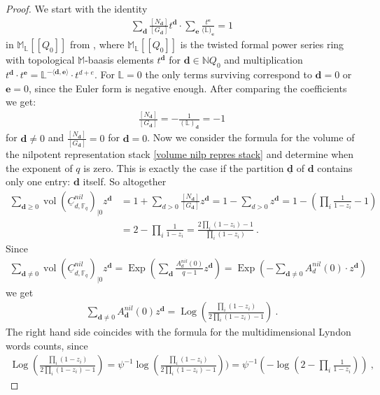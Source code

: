 \documentclass{article}
\newcommand{\bd}{\mathbf{d}}
\newcommand{\be}{\mathbf{e}}
\DeclareMathOperator{\Exp}{Exp}
\DeclareMathOperator{\vol}{vol}
\DeclareMathOperator{\Log}{Log}
\begin{document}
 \begin{proof}
   We start with the identity 
   \begin{align*}
       \sum_{\bd} \frac{[N_{\bd}]}{[G_{\bd}]} t^{\bd} \cdot \sum_{\be} \frac{t^{\be}}{(\mathbb{L)_{\be}}}=1
   \end{align*}
   in $\mathbb{M}_{\mathbb{L}}[[Q_0]]$ from \cite{motivenullcone}, where $\mathbb{M}_{\mathbb{L}} [[Q_0]]$ is the twisted formal power series ring with topological $\mathbb{M}$-baasis elements $t^{\bd}$ for $\bd \in \mathbb{N}Q_0$ and multiplication $t^{\bd} \cdot t^{\be} = \mathbb{L}^{-\langle \bd, \be \rangle} \cdot t^{d+e}$. For $\mathbb{L} =0$ the only terms surviving correspond to $\bd=0$ or $\be =0$, since the Euler form is negative enough. After comparing the coefficients we get:
   \begin{align*}
       \frac{[N_{\bd}]}{[G_{\bd}]} = - \frac{1}{(\mathbb{L})_{\bd}} = -1
   \end{align*}
   for $\bd \neq 0$ and $ \frac{[N_{\bd}]}{[G_{\bd}]}=0$ for $\bd =0$.
   Now we consider the formula for the volume of the nilpotent representation stack \ref{volume nilp repres stack} and determine when the exponent of $q$ is zero. This is exactly the case if the partition $\underline{\bd}$ of $\bd$ contains only one entry: $\bd$ itself. So altogether
   \begin{align*}
       \sum_{\bd \geq 0} \vol(\underline{C}^{nil}_{d,  \mathbb{F}_q})_{|0} z^{\bd} &= 1 + \sum_{d > 0} \frac{[N_{\bd}]}{[G_{\bd}]} z^{\bd} = 1 - \sum_{d >0} z^{\bd} = 1 - (\prod_i \frac{1}{1-z_i}-1) \\
       &= 2 - \prod_i \frac{1}{1-z_i} = \frac{2 \prod_i (1-z_i)-1}{\prod_i (1-z_i)}~.
   \end{align*}
   Since 
   \begin{align*}
       \sum_{\bd \neq 0}  \vol(\underline{C}^{nil}_{d,  \mathbb{F}_q})_{|0} z^{\bd} = \Exp (\sum_{\bd} \frac{A^{nil}_d(0)}{q-1}z^{\bd}) = \Exp  (-\sum_{\bd \neq 0} A^{nil}_d(0) \cdot z^{\bd})
   \end{align*}
   we get 
   \begin{align*}
     \sum_{\bd \neq 0} A_{\bd}^{nil}(0) z^{\bd} = \Log (\frac{\prod_i (1-z_i)}{2 \prod_i (1-z_i)-1})~.
   \end{align*}
The right hand side coincides with the formula for the multidimensional Lyndon words counts, since
\begin{align*}
    \Log (\frac{\prod_i (1-z_i)}{2 \prod_i (1-z_i)-1}) = \psi^{-1}  \log (\frac{\prod_i (1-z_i)}{2 \prod_i (1-z_i)-1})) = \psi^{-1} (- \log (2- \prod_i \frac{1}{1-z_i}))~,

\end{align*}
\end{proof}
\end{document}
